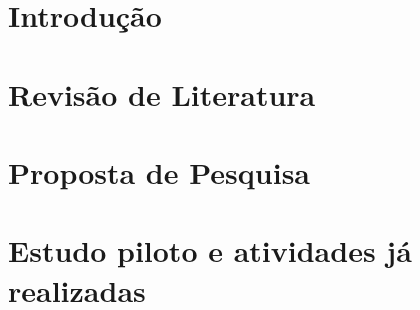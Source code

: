 \documentclass[
	12pt,				%
	oneside,			%
	a4paper,			%
	english,			%
	brazil				%
	]{abntex2ppgsi}
\begin{document}
\tableofcontents*
\cleardoublepage



\textual



% 
%
%
\chapter{Introdução}


\label{chap:introducao}

\chapter{Revisão de Literatura}
\label{chap:background}



\chapter{Proposta de Pesquisa}
\label{chap:proposta}


\chapter{Estudo piloto e atividades já realizadas}
\label{chap:atividades}


\postextual


\end{document}
